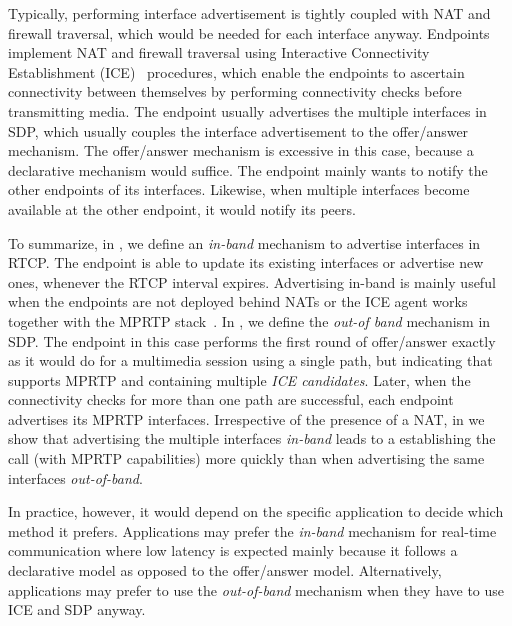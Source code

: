 
Typically, performing interface advertisement is tightly coupled with NAT and
firewall traversal, which would be needed for each interface anyway. Endpoints
implement NAT and firewall traversal using Interactive Connectivity Establishment
(ICE)~\cite{rfc5245} procedures, which enable the endpoints to ascertain
connectivity between themselves by performing connectivity checks before
transmitting media. The endpoint usually advertises the multiple interfaces in
SDP, which usually couples the interface advertisement to the offer/answer
mechanism. The offer/answer mechanism is excessive in this case, because a
declarative mechanism would suffice. The endpoint mainly wants to notify the
other endpoints of its interfaces. Likewise, when multiple interfaces become
available at the other endpoint, it would notify its peers.

To summarize, in \cite{draft.mprtp}, we define an \emph{in-band} mechanism to
advertise interfaces in RTCP. The endpoint is able to update its existing
interfaces or advertise new ones, whenever the RTCP interval expires.
Advertising in-band is mainly useful when the endpoints are not deployed
behind NATs or the ICE agent works together with the MPRTP
stack~\cite{draft.mice}. In \cite{draft.mprtp.sdp}, we define the \emph{out-of
band} mechanism in SDP. The endpoint in this case performs the first round of
offer/answer exactly as it would do for a multimedia session using a single
path, but indicating that supports MPRTP and containing multiple \emph{ICE
candidates}. Later, when the connectivity checks for more than one path are
successful, each endpoint advertises its MPRTP interfaces. Irrespective of the
presence of a NAT, in  we show that advertising the multiple
interfaces \emph{in-band} leads to a establishing the call (with MPRTP
capabilities) more quickly than when advertising the same interfaces
\emph{out-of-band}.

In practice, however, it would depend on the specific application to decide
which method it prefers. Applications may prefer the \emph{in-band} mechanism
for real-time communication where low latency is expected mainly because it
follows a declarative model as opposed to the offer/answer model.
Alternatively, applications may prefer to use the \emph{out-of-band}
mechanism when they have to use ICE and SDP anyway.


